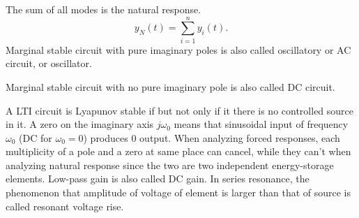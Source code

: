 \documentclass[a4paper,12pt]{article}
\begin{document}
The sum of all modes is the natural response.
\[y_N(t)=\sum_{i=1}^ny_i(t).\]
Marginal stable circuit with pure imaginary poles is also called oscillatory or AC circuit, or oscillator.

Marginal stable circuit with no pure imaginary pole is also called DC circuit.

A LTI circuit is Lyapunov stable if but not only if it there is no controlled source in it.
A zero on the imaginary axis $j\omega_0$ means that sinusoidal input of frequency $\omega_0$ (DC for $\omega_0=0$) produces $0$ output.
When analyzing forced responses, each multiplicity of a pole and a zero at same place can cancel, while they can't when analyzing natural response since the two are two independent energy-storage elements.
Low-pass gain is also called DC gain.
In series resonance, the phenomenon that amplitude of voltage of element is larger than that of source is called resonant voltage rise.
\end{document}
